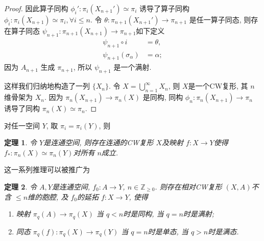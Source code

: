 \documentclass{ctexart}
\theoremstyle{plain}
\newtheorem{theorem}{定理}[section]
\theoremstyle{definition}
\begin{document}
\begin{proof}
            因此算子同构 $\phi_{i}':\pi_{i}(X_{n+1}')\simeq \pi_{i}$ 诱导了算子同构 $\phi_{i}:\pi_{i}(X_{n+1})\simeq \pi_{i}, \forall i\le n$. 令 $\theta:\pi_{n+1}(X_{n+1}')\to \pi_{n+1}$ 是任一算子同态, 则存在算子同态 $\psi_{n+1}:\pi_{n+1}(X_{n+1})\to \pi_{n+1}$如下定义 
            \begin{equation*}
              \begin{aligned}
              \psi_{n+1}\circ i & = \theta, \\
              \psi_{n+1}(\sigma_{\alpha}) &= \alpha ;
              \end{aligned}
            \end{equation*}
            因为 $A_{n+1}$ 生成 $\pi_{n+1}$, 所以 $\psi_{n+1}$ 是一个满射.

            这样我们归纳地构造了一列 $\{X_{n}\}$. 令 $X=\bigcup _{n=1}^{\infty}X_{n}$, 则 $X$是一个CW复形, 其 $n$维骨架为 $X_{n}$. 因为 $\pi_{n}(X_{n+1})\to \pi_{n}(X)$ 是同构, 同构 $\phi_{n}:\pi_{n}(X_{n+1})\to \pi_{n}$ 诱导了同构 $\pi_{n}(X)\simeq \pi_{n}$.
        \end{proof}

        对任一空间 $Y$, 取 $\pi_{i}=\pi_{i}(Y)$, 则

        \begin{theorem}
            \label{thm:CW approx}
            令 $Y$是连通空间, 则存在连通的CW复形 $X$及映射 $f:X\to Y$使得 $f_*:\pi_{n}(X)\simeq \pi_{n}(Y)$对所有 $n$成立.
        \end{theorem}

        这一系列推理可以被推广为 
        
        \begin{theorem}
            令 $A, Y$是连通空间, $f_0:A\to Y$, $n\in \mathbb{Z}_{\ge 0}$. 则存在相对CW复形 $(X,A)$不含 $\le n$维的胞腔, 及 $f_0$的延拓 $f:X\to Y$, 使得
            \begin{enumerate}
                \item 映射 $\pi_{q}(A)\to \pi_{q}(X)$ 当 $q<n$时是同构, 当 $q=n$时是满射;
                \item 同态 $\pi_{q}(f):\pi_{q}(X)\to \pi_{q}(Y)$ 当 $q=n$时是单态, 当 $q>n$时是满态.
            \end{enumerate}
        \end{theorem}
\end{document}

